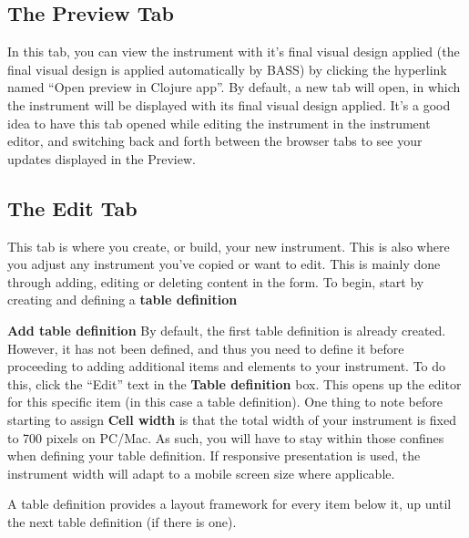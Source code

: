 \documentclass[
]{book}
\begin{document}
\subsection{The Preview Tab}\label{the-preview-tab}

In this tab, you can view the instrument with it's final visual design applied (the final visual design is applied automatically by BASS) by clicking the hyperlink named ``Open preview in Clojure app''.
By default, a new tab will open, in which the instrument will be displayed with its final visual design applied. It's a good idea to have this tab opened while editing the instrument in the instrument editor, and switching back and forth between the browser tabs to see your updates displayed in the Preview.

\subsection{The Edit Tab}\label{the-edit-tab}

This tab is where you create, or build, your new instrument. This is also where you adjust any instrument you've copied or want to edit. This is mainly done through adding, editing or deleting content in the form.
To begin, start by creating and defining a \textbf{table definition}

\textbf{Add table definition}
By default, the first table definition is already created. However, it has not been defined, and thus you need to define it before proceeding to adding additional items and elements to your instrument. To do this, click the ``Edit'' text in the \textbf{Table definition} box. This opens up the editor for this specific item (in this case a table definition).
One thing to note before starting to assign \textbf{Cell width} is that the total width of your instrument is fixed to 700 pixels on PC/Mac. As such, you will have to stay within those confines when defining your table definition.
If responsive presentation is used, the instrument width will adapt to a mobile screen size where applicable.

A table definition provides a layout framework for every item below it, up until the next table definition (if there is one).
\end{document}
